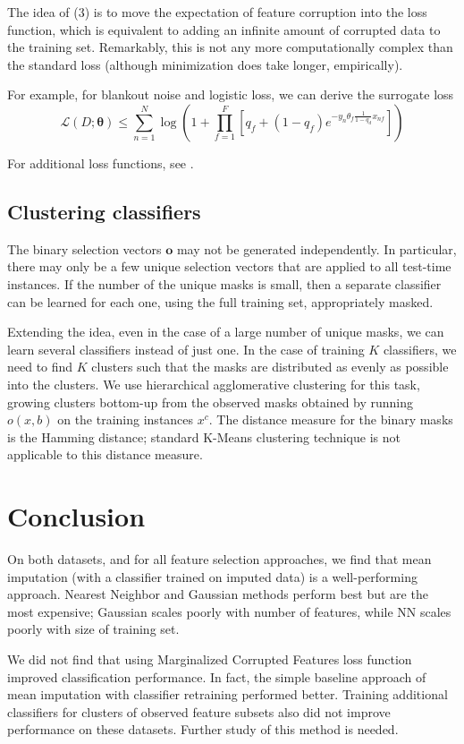 The idea of (3) is to move the expectation of feature corruption into the loss function, which is equivalent to adding an infinite amount of corrupted data to the training set.
Remarkably, this is not any more computationally complex than the standard loss (although minimization does take longer, empirically).

For example, for blankout noise and logistic loss, we can derive the surrogate loss
\begin{equation}
\mathcal{L}(D; \mathbf{\theta}) \leq \sum_{n=1}^N \log \left( 1 + \prod_{f=1}^F \left[ q_f + (1 - q_f) e^{-y_n \theta_f \frac{1}{1 - q_d} x_{nf}} \right] \right)
\end{equation}

For additional loss functions, see \cite{Maaten-ICML-2013}.

\subsection{Clustering classifiers}

The binary selection vectors $\mathbf{o}$ may not be generated independently.
In particular, there may only be a few unique selection vectors that are applied to all test-time instances.
If the number of the unique masks is small, then a separate classifier can be learned for each one, using the full training set, appropriately masked.

Extending the idea, even in the case of a large number of unique masks, we can learn several classifiers instead of just one.
In the case of training $K$ classifiers, we need to find $K$ clusters such that the masks are distributed as evenly as possible into the clusters.
We use hierarchical agglomerative clustering for this task, growing clusters bottom-up from the observed masks obtained by running $o(x, b)$ on the training instances $x^c$.
The distance measure for the binary masks is the Hamming distance; standard K-Means clustering technique is not applicable to this distance measure.


 
\section{Conclusion}

On both datasets, and for all feature selection approaches, we find that mean imputation (with a classifier trained on imputed data) is a well-performing approach.
Nearest Neighbor and Gaussian methods perform best but are the most expensive; Gaussian scales poorly with number of features, while NN scales poorly with size of training set.

We did not find that using Marginalized Corrupted Features loss function improved classification performance.
In fact, the simple baseline approach of mean imputation with classifier retraining performed better.
Training additional classifiers for clusters of observed feature subsets also did not improve performance on these datasets.
Further study of this method is needed.
